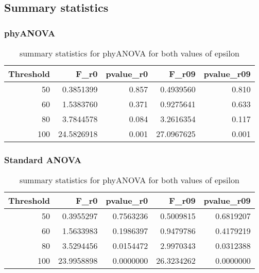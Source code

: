 \documentclass[]{article}
\begin{document}
\hypertarget{summary-statistics-2}{%
\subsection{Summary statistics}\label{summary-statistics-2}}

\hypertarget{phyanova-4}{%
\subsubsection{phyANOVA}\label{phyanova-4}}

\begin{table}[H]

\caption{\label{tab:unnamed-chunk-29}summary statistics for phyANOVA for both values of epsilon}
\centering
\begin{tabular}{r|r|r|r|r}
\hline
Threshold & F\_r0 & pvalue\_r0 & F\_r09 & pvalue\_r09\\
\hline
50 & 0.3851399 & 0.857 & 0.4939560 & 0.810\\
\hline
60 & 1.5383760 & 0.371 & 0.9275641 & 0.633\\
\hline
80 & 3.7844578 & 0.084 & 3.2616354 & 0.117\\
\hline
100 & 24.5826918 & 0.001 & 27.0967625 & 0.001\\
\hline
\end{tabular}
\end{table}

\hypertarget{standard-anova-4}{%
\subsubsection{Standard ANOVA}\label{standard-anova-4}}

\begin{table}[H]

\caption{\label{tab:unnamed-chunk-30}summary statistics for phyANOVA for both values of epsilon}
\centering
\begin{tabular}{r|r|r|r|r}
\hline
Threshold & F\_r0 & pvalue\_r0 & F\_r09 & pvalue\_r09\\
\hline
50 & 0.3955297 & 0.7563236 & 0.5009815 & 0.6819207\\
\hline
60 & 1.5633983 & 0.1986397 & 0.9479786 & 0.4179219\\
\hline
80 & 3.5294456 & 0.0154472 & 2.9970343 & 0.0312388\\
\hline
100 & 23.9958898 & 0.0000000 & 26.3234262 & 0.0000000\\
\hline
\end{tabular}
\end{table}
\end{document}
